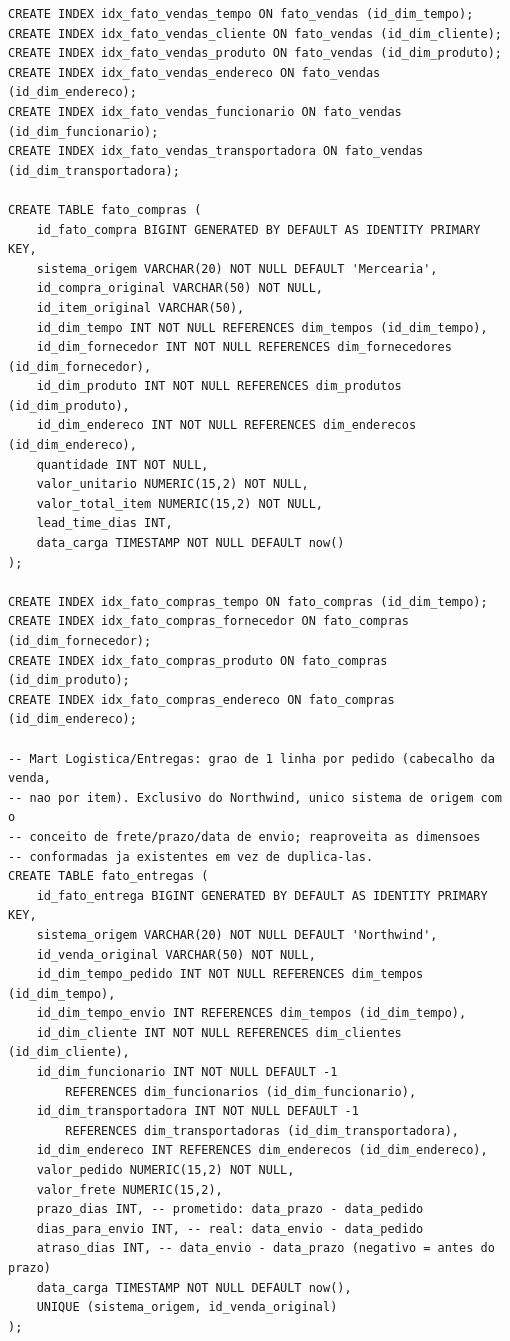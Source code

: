 {\begin{verbatim}
CREATE INDEX idx_fato_vendas_tempo ON fato_vendas (id_dim_tempo);
CREATE INDEX idx_fato_vendas_cliente ON fato_vendas (id_dim_cliente);
CREATE INDEX idx_fato_vendas_produto ON fato_vendas (id_dim_produto);
CREATE INDEX idx_fato_vendas_endereco ON fato_vendas (id_dim_endereco);
CREATE INDEX idx_fato_vendas_funcionario ON fato_vendas (id_dim_funcionario);
CREATE INDEX idx_fato_vendas_transportadora ON fato_vendas (id_dim_transportadora);

CREATE TABLE fato_compras (
    id_fato_compra BIGINT GENERATED BY DEFAULT AS IDENTITY PRIMARY KEY,
    sistema_origem VARCHAR(20) NOT NULL DEFAULT 'Mercearia',
    id_compra_original VARCHAR(50) NOT NULL,
    id_item_original VARCHAR(50),
    id_dim_tempo INT NOT NULL REFERENCES dim_tempos (id_dim_tempo),
    id_dim_fornecedor INT NOT NULL REFERENCES dim_fornecedores (id_dim_fornecedor),
    id_dim_produto INT NOT NULL REFERENCES dim_produtos (id_dim_produto),
    id_dim_endereco INT NOT NULL REFERENCES dim_enderecos (id_dim_endereco),
    quantidade INT NOT NULL,
    valor_unitario NUMERIC(15,2) NOT NULL,
    valor_total_item NUMERIC(15,2) NOT NULL,
    lead_time_dias INT,
    data_carga TIMESTAMP NOT NULL DEFAULT now()
);

CREATE INDEX idx_fato_compras_tempo ON fato_compras (id_dim_tempo);
CREATE INDEX idx_fato_compras_fornecedor ON fato_compras (id_dim_fornecedor);
CREATE INDEX idx_fato_compras_produto ON fato_compras (id_dim_produto);
CREATE INDEX idx_fato_compras_endereco ON fato_compras (id_dim_endereco);

-- Mart Logistica/Entregas: grao de 1 linha por pedido (cabecalho da venda,
-- nao por item). Exclusivo do Northwind, unico sistema de origem com o
-- conceito de frete/prazo/data de envio; reaproveita as dimensoes
-- conformadas ja existentes em vez de duplica-las.
CREATE TABLE fato_entregas (
    id_fato_entrega BIGINT GENERATED BY DEFAULT AS IDENTITY PRIMARY KEY,
    sistema_origem VARCHAR(20) NOT NULL DEFAULT 'Northwind',
    id_venda_original VARCHAR(50) NOT NULL,
    id_dim_tempo_pedido INT NOT NULL REFERENCES dim_tempos (id_dim_tempo),
    id_dim_tempo_envio INT REFERENCES dim_tempos (id_dim_tempo),
    id_dim_cliente INT NOT NULL REFERENCES dim_clientes (id_dim_cliente),
    id_dim_funcionario INT NOT NULL DEFAULT -1
        REFERENCES dim_funcionarios (id_dim_funcionario),
    id_dim_transportadora INT NOT NULL DEFAULT -1
        REFERENCES dim_transportadoras (id_dim_transportadora),
    id_dim_endereco INT REFERENCES dim_enderecos (id_dim_endereco),
    valor_pedido NUMERIC(15,2) NOT NULL,
    valor_frete NUMERIC(15,2),
    prazo_dias INT, -- prometido: data_prazo - data_pedido
    dias_para_envio INT, -- real: data_envio - data_pedido
    atraso_dias INT, -- data_envio - data_prazo (negativo = antes do prazo)
    data_carga TIMESTAMP NOT NULL DEFAULT now(),
    UNIQUE (sistema_origem, id_venda_original)
);


\end{verbatim}}
